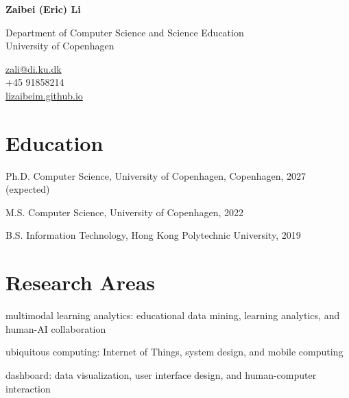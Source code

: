 \documentclass[11pt,letterpaper]{report}
\newcommand{\myname}{Zaibei (Eric) Li}
\newcommand{\namefont}[1]{{\normalfont\bfseries\Huge{#1}}}
\newcommand{\listitemspace}{0.25em}
\renewenvironment{itemize}
{\begin{list}{}{\setlength{\leftmargin}{0em}
                \setlength{\parskip}{0em}
                \setlength{\itemsep}{\listitemspace}
                \setlength{\parsep}{\listitemspace}}}
{\end{list}}
\begin{document}
    \raggedright{}

    \namefont{\myname}

    \vspace{1em}
    \begin{minipage}[t]{0.700\textwidth}
        Department of Computer Science and Science Education\\
        University of Copenhagen
    \end{minipage}
    \begin{minipage}[t]{0.295\textwidth}
        \flushright{}
        \href{mailto:zali@di.ku.dk}{zali@di.ku.dk} \\
        +45 91858214 \\
        \href{https://lizaibeim.github.io}{lizaibeim.github.io}
    \end{minipage}


    \section*{Education}

    \begin{tablist}

        \item[Ph.D.] \tab{}Computer Science, University of Copenhagen, Copenhagen, 2027 (expected)
        \item[M.S.]  \tab{}Computer Science, University of Copenhagen, 2022
        \item[B.S.]  \tab{}Information Technology, Hong Kong Polytechnic University, 2019

    \end{tablist}

    \section*{Research Areas}

    \begin{itemize}

        \item multimodal learning analytics: educational data mining, learning analytics, and human-AI collaboration
        \item ubiquitous computing: Internet of Things, system design, and mobile computing
        \item dashboard: data visualization, user interface design, and human-computer interaction

    \end{itemize}
\end{document}
